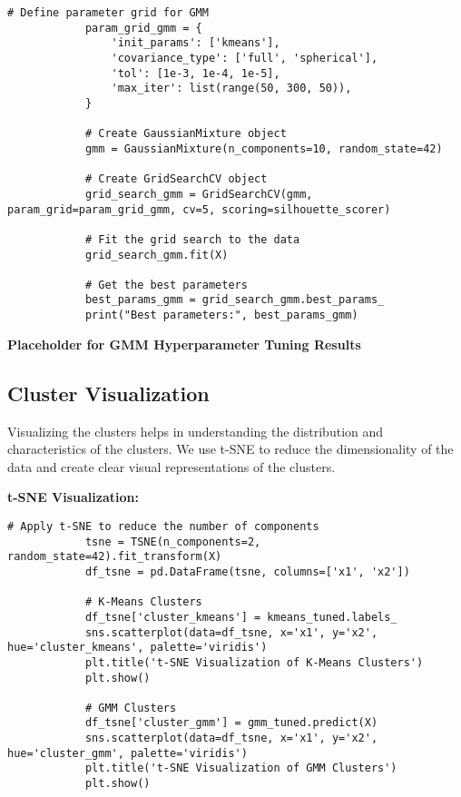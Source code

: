         \begin{lstlisting}[caption={Grid Search for Gaussian Mixture Model (GMM)}, label={lst:grid_search_gmm}]
            # Define parameter grid for GMM
            param_grid_gmm = {
                'init_params': ['kmeans'],
                'covariance_type': ['full', 'spherical'],
                'tol': [1e-3, 1e-4, 1e-5],
                'max_iter': list(range(50, 300, 50)),
            }
            
            # Create GaussianMixture object
            gmm = GaussianMixture(n_components=10, random_state=42)
            
            # Create GridSearchCV object
            grid_search_gmm = GridSearchCV(gmm, param_grid=param_grid_gmm, cv=5, scoring=silhouette_scorer)
            
            # Fit the grid search to the data
            grid_search_gmm.fit(X)
            
            # Get the best parameters
            best_params_gmm = grid_search_gmm.best_params_
            print("Best parameters:", best_params_gmm)
        \end{lstlisting}

        \textbf{Placeholder for GMM Hyperparameter Tuning Results}
            
    \subsection{Cluster Visualization}
    
        Visualizing the clusters helps in understanding the distribution and characteristics of the clusters. We use t-SNE to reduce the dimensionality of the data and create clear visual representations of the clusters.

        \textbf{t-SNE Visualization:}
        
        \vspace{0.5em}

        \begin{lstlisting}[caption={t-SNE Visualization of Clusters}, label={lst:tsne_visualization}]
            # Apply t-SNE to reduce the number of components
            tsne = TSNE(n_components=2, random_state=42).fit_transform(X)
            df_tsne = pd.DataFrame(tsne, columns=['x1', 'x2'])
            
            # K-Means Clusters
            df_tsne['cluster_kmeans'] = kmeans_tuned.labels_
            sns.scatterplot(data=df_tsne, x='x1', y='x2', hue='cluster_kmeans', palette='viridis')
            plt.title('t-SNE Visualization of K-Means Clusters')
            plt.show()
            
            # GMM Clusters
            df_tsne['cluster_gmm'] = gmm_tuned.predict(X)
            sns.scatterplot(data=df_tsne, x='x1', y='x2', hue='cluster_gmm', palette='viridis')
            plt.title('t-SNE Visualization of GMM Clusters')
            plt.show()
        \end{lstlisting}

